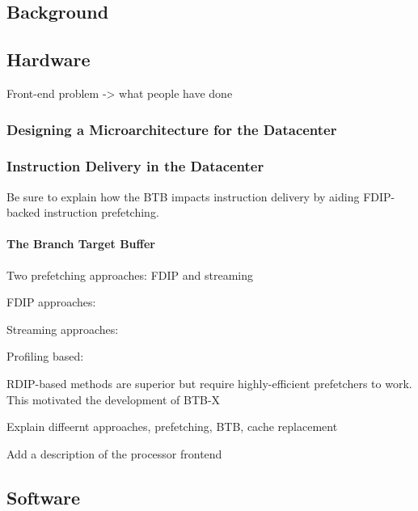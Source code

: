\documentclass[../main.tex]{subfiles}
\begin{document}
\ifx\chapincluded\undefined
  \begin{refsection}
 \fi

\chapter{Background}
\label{chap:background}

\section{Hardware}

Front-end problem -> what people have done

\subsection{Designing a Microarchitecture for the Datacenter}
\cite{kanev15_profil,ferdman12_clear_cloud}


\subsection{Instruction Delivery in the Datacenter}
\label{sec:instr-delivery}
Be sure to explain how the BTB impacts instruction delivery by aiding FDIP-backed instruction prefetching.

\subsubsection{The Branch Target Buffer}
\label{sec:btb-hebackground}

Two prefetching approaches: FDIP and streaming


FDIP approaches: \cite{reinman99_fetch_direc_instr_prefet, kumar17_boomer,kumar18_blast_throug_front_end_bottl_with_shotg,kumar20_shoot_down_server_front_end_bottl}

Streaming approaches:
\cite{ferdman08_tempor,ferdman11_proac_instr_fetch,kaynak13_shift,kaynak15_confl}

Profiling based:

RDIP-based methods are superior but require highly-efficient prefetchers to work. This motivated the development of BTB-X

Explain diffeernt approaches, prefetching, BTB, cache replacement

Add a description of the processor frontend

\section{Software}


\end{refsection}
\end{document}
